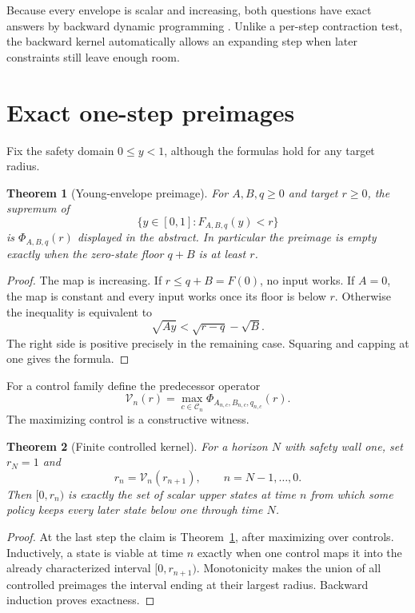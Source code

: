 \documentclass[12pt]{article}
\newtheorem{theorem}{Theorem}
\begin{document}
Because every envelope is scalar and increasing, both questions have exact
answers by backward dynamic programming \citep{Aubin1991,Bertsekas2017}.
Unlike a per-step contraction test, the backward kernel automatically allows
an expanding step when later constraints still leave enough room.

\section{Exact one-step preimages}
Fix the safety domain $0\leq y<1$, although the formulas hold for any target
radius.

\begin{theorem}[Young-envelope preimage]\label{thm:preimage}
For $A,B,q\geq0$ and target $r\geq0$, the supremum of
\[
 \{y\in[0,1]:F_{A,B,q}(y)<r\}
\]
is $\Phi_{A,B,q}(r)$ displayed in the abstract.  In particular the preimage
is empty exactly when the zero-state floor $q+B$ is at least $r$.
\end{theorem}
\begin{proof}
The map is increasing.  If $r\leq q+B=F(0)$, no input works.  If $A=0$, the
map is constant and every input works once its floor is below $r$.  Otherwise
the inequality is equivalent to
\[
 \sqrt{Ay}<\sqrt{r-q}-\sqrt B.
\]
The right side is positive precisely in the remaining case.  Squaring and
capping at one gives the formula.
\end{proof}

For a control family define the predecessor operator
\[
 \mathcal V_n(r)=\max_{c\in\mathcal C_n}\Phi_{A_{n,c},B_{n,c},q_{n,c}}(r).
\]
The maximizing control is a constructive witness.

\begin{theorem}[Finite controlled kernel]\label{thm:kernel}
For a horizon $N$ with safety wall one, set $r_N=1$ and
\[
 r_n=\mathcal V_n(r_{n+1}),\qquad n=N-1,\ldots,0.
\]
Then $[0,r_n)$ is exactly the set of scalar upper states at time $n$ from
which some policy keeps every later state below one through time $N$.
\end{theorem}
\begin{proof}
At the last step the claim is Theorem~\ref{thm:preimage}, after maximizing
over controls.  Inductively, a state is viable at time $n$ exactly when one
control maps it into the already characterized interval $[0,r_{n+1})$.
Monotonicity makes the union of all controlled preimages the interval ending
at their largest radius.  Backward induction proves exactness.
\end{proof}
\end{document}
